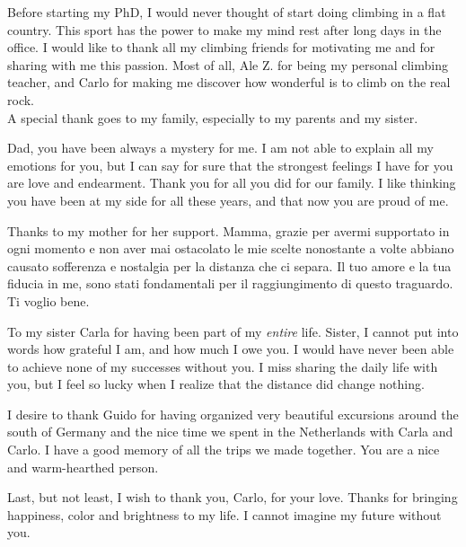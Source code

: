 Before starting my PhD, I would never thought of start doing climbing in a flat country. This sport has the power to make my mind rest after long days in the office.
I would like to thank all my climbing friends for motivating me and for sharing with me this passion. Most of all, Ale Z. for being my personal climbing teacher, and Carlo for making me discover how wonderful is to climb on the real rock.\\ 

A special thank goes to my family, especially to my parents and my sister.

Dad, you have been always a mystery for me. I am not able to explain all my emotions for you, but I can say for sure that the strongest feelings I have for you are love and endearment. Thank you for all you did for our family. I like thinking you have been at my side for all these years, and that now you are proud of me.

Thanks to my mother for her support. Mamma, grazie per avermi supportato in ogni momento e non aver mai ostacolato le mie scelte nonostante a volte abbiano causato sofferenza e nostalgia per la distanza che ci separa. Il tuo amore e la tua fiducia in me, sono stati fondamentali per il raggiungimento di questo traguardo. Ti voglio bene.   

To my sister Carla for having been part of my \textit{entire} life. Sister, I cannot put into words how grateful I am, and how much I owe you. I would have never been able to achieve none of my successes without you.
I miss sharing the daily life with you, but I feel so lucky when I realize that the distance did change nothing. 

I desire to thank Guido for having organized very beautiful excursions around the south of Germany and the nice time we spent in the Netherlands with Carla and Carlo. I have a good memory of all the trips we made together. You are a nice and warm-hearthed person.

Last, but not least, I wish to thank you, Carlo, for your love. 
Thanks for bringing happiness, color and brightness to my life. I cannot imagine my future without you.
